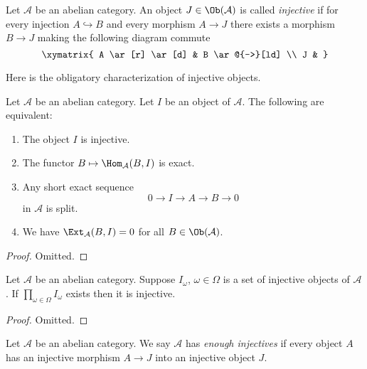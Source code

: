 \begin{definition}
\label{definition-injective}
Let $\mathcal{A}$ be an abelian category.
An object $J \in \Ob(\mathcal{A})$ is
called {\it injective} if for every injection
$A \hookrightarrow B$ and every morphism
$A \to J$ there exists a morphism $B \to J$ making
the following diagram commute
$$
\xymatrix{
A \ar[r] \ar[d] & B \ar@{-->}[ld] \\
J &
}
$$
\end{definition}

\noindent
Here is the obligatory characterization of injective objects.

\begin{lemma}
\label{lemma-characterize-injectives}
Let $\mathcal{A}$ be an abelian category.
Let $I$ be an object of $\mathcal{A}$.
The following are equivalent:
\begin{enumerate}
\item The object $I$ is injective.
\item The functor $B \mapsto \Hom_\mathcal{A}(B, I)$
is exact.
\item Any short exact sequence
$$
0 \to I \to A \to B \to 0
$$
in $\mathcal{A}$ is split.
\item We have $\Ext_\mathcal{A}(B, I) = 0$ for
all $B \in \Ob(\mathcal{A})$.
\end{enumerate}
\end{lemma}

\begin{proof}
Omitted.
\end{proof}

\begin{lemma}
\label{lemma-product-injectives}
Let $\mathcal{A}$ be an abelian category.
Suppose $I_\omega$, $\omega \in \Omega$ is a set of injective
objects of $\mathcal{A}$. If $\prod_{\omega \in \Omega} I_\omega$
exists then it is injective.
\end{lemma}

\begin{proof}
Omitted.
\end{proof}

\begin{definition}
\label{definition-enough-injectives}
Let $\mathcal{A}$ be an abelian category.
We say $\mathcal{A}$ has {\it enough injectives}
if every object $A$ has an injective morphism
$A \to J$ into an injective object $J$.
\end{definition}

